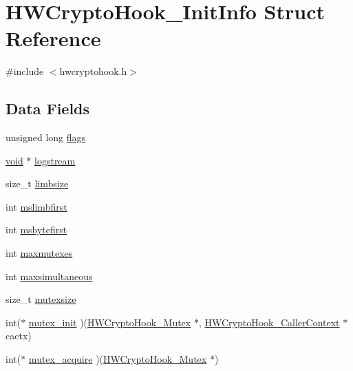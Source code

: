 \hypertarget{struct_h_w_crypto_hook___init_info}{}\section{H\+W\+Crypto\+Hook\+\_\+\+Init\+Info Struct Reference}
\label{struct_h_w_crypto_hook___init_info}


{\ttfamily \#include $<$hwcryptohook.\+h$>$}

\subsection*{Data Fields}
\begin{DoxyCompactItemize}
\item 
unsigned long \hyperlink{struct_h_w_crypto_hook___init_info_a9e339c2784bd040b26a5112866700bff}{flags}
\item 
\hyperlink{hw__4758__cca_8h_afad4d591c7931ff6dc5bf69c76c96aa0}{void} $\ast$ \hyperlink{struct_h_w_crypto_hook___init_info_ad16e9ce43d8bbe64b809390c2e3f08c8}{logstream}
\item 
size\+\_\+t \hyperlink{struct_h_w_crypto_hook___init_info_a873d0122e4fcd188ee1913765e0986e6}{limbsize}
\item 
int \hyperlink{struct_h_w_crypto_hook___init_info_acbac74f5ed48c14b7615784fa4a4b762}{mslimbfirst}
\item 
int \hyperlink{struct_h_w_crypto_hook___init_info_a130ff9964f555758e0f755b24ccc0380}{msbytefirst}
\item 
int \hyperlink{struct_h_w_crypto_hook___init_info_a2bfb52bf3fd5eeb3627b98c18080b058}{maxmutexes}
\item 
int \hyperlink{struct_h_w_crypto_hook___init_info_a12a828d6014a1a3122eb47f712e80b12}{maxsimultaneous}
\item 
size\+\_\+t \hyperlink{struct_h_w_crypto_hook___init_info_a3a25249b31be230c188d6f4a645ad9fb}{mutexsize}
\item 
int($\ast$ \hyperlink{struct_h_w_crypto_hook___init_info_aed2191c7438350c90cb51091938bf2ba}{mutex\+\_\+init} )(\hyperlink{hwcryptohook_8h_ad56b196e4a0088e63bce614d2ceae805}{H\+W\+Crypto\+Hook\+\_\+\+Mutex} $\ast$, \hyperlink{hwcryptohook_8h_a1a0a7d8e24f7e1f3fab7690034401466}{H\+W\+Crypto\+Hook\+\_\+\+Caller\+Context} $\ast$cactx)
\item 
int($\ast$ \hyperlink{struct_h_w_crypto_hook___init_info_a4fc118915dbbf7812b7eb392a9793c02}{mutex\+\_\+acquire} )(\hyperlink{hwcryptohook_8h_ad56b196e4a0088e63bce614d2ceae805}{H\+W\+Crypto\+Hook\+\_\+\+Mutex} $\ast$)

\end{DoxyCompactItemize}
